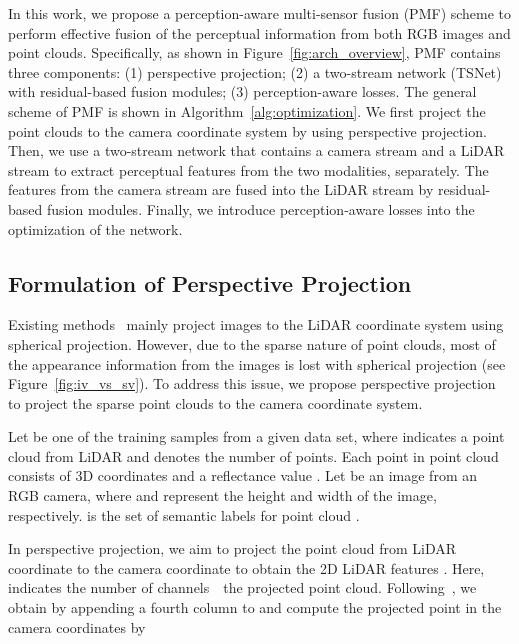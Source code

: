 \documentclass[10pt,twocolumn,letterpaper]{article}
\begin{document}
In this work, we propose a perception-aware multi-sensor fusion (PMF) scheme to perform effective fusion of the perceptual information from both RGB images and point clouds. Specifically, as shown in Figure~\ref{fig:arch_overview}, PMF contains three components: (1) perspective projection; (2) a two-stream network (TSNet) with residual-based fusion modules; (3) perception-aware losses. The general scheme of PMF is shown in Algorithm~\ref{alg:optimization}. We first project the point clouds to the camera coordinate system by using perspective projection. Then, we use a two-stream network that contains a camera stream and a LiDAR stream to extract perceptual features from the two modalities, separately. The features from the camera stream are fused into the LiDAR stream by residual-based fusion modules. Finally, we introduce perception-aware losses into the optimization of the network.








\subsection{Formulation of Perspective Projection}
\label{sec:projection}

Existing methods~\cite{Madawy2019RGBAL,vora2020pointpainting} mainly project  images to the LiDAR coordinate system using spherical projection. However, due to the sparse nature of point clouds, most of the appearance information from the images is lost with spherical projection (see Figure~\ref{fig:iv_vs_sv}). To address this issue, we propose perspective projection to project the sparse point clouds to the camera coordinate system.


Let  be one of the training samples from a given data set, where  indicates a point cloud from LiDAR and  denotes the number of points. Each point  in point cloud  consists of 3D coordinates  and a reflectance value . Let  be an image from an RGB camera, where  and  represent the height and width of the image, respectively.  is the set of semantic labels for point cloud .


In perspective projection, we aim to project the point cloud  from LiDAR coordinate to the camera coordinate to obtain the 2D LiDAR features . Here,  indicates the number of channels~\wrt~the projected point cloud. Following~\cite{geiger2013vision}, we obtain  by appending a fourth column to  and compute the projected point  in the camera coordinates by
\end{document}
